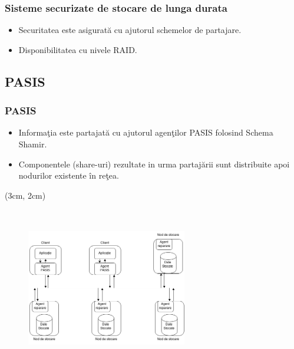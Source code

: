 \documentclass{beamer}
\theoremstyle{definition}
\begin{document}
\begin{frame}
    \frametitle{Sisteme securizate de stocare de lunga durata}
    \begin{itemize}
        \item Securitatea este asigurat\u{a} cu ajutorul schemelor de partajare.
        \pause
        \item Disponibilitatea cu nivele RAID.
    \end{itemize}
\end{frame}


\subsection{PASIS}

\begin{frame}
    \frametitle{PASIS}
     {
        \begin{itemize}
            \item Informa\c{t}ia este partajat\u{a} cu ajutorul agen\c{t}ilor PASIS folosind Schema Shamir.
            \pause
            \item Componentele (share-uri) rezultate in urma partaj\u{a}rii sunt distribuite apoi nodurilor existente \^{i}n re\c{t}ea.
        \end{itemize}
    }
     {
         \begin{textblock*}{4cm}(3cm, 2cm)
            \begin{figure}
                \includegraphics[width=7cm,height=7cm,keepaspectratio]{img/raid/PASIS.png}
           \end{figure}
        \end{textblock*}
    }
\end{frame}
\end{document}
